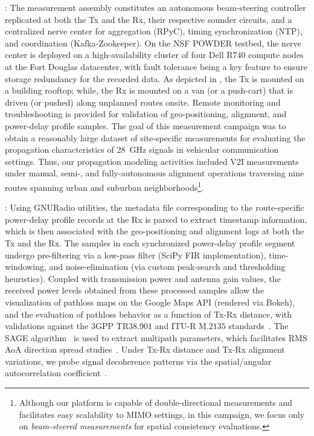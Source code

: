 \documentclass[10pt, twocolumn]{IEEEtran}
\begin{document}
: The measurement assembly constitutes an autonomous beam-steering controller replicated at both the Tx and the Rx, their respective sounder circuits, and a centralized nerve center for aggregation (RPyC), timing synchronization (NTP), and coordination (Kafka-Zookeeper). On the NSF POWDER testbed, the nerve center is deployed on a high-availability cluster of four Dell R$740$ compute nodes at the Fort Douglas datacenter, with fault tolerance being a key feature to ensure storage redundancy for the recorded data. As depicted in \cite{ICC}, the Tx is mounted on a building rooftop; while, the Rx is mounted on a van (or a push-cart) that is driven (or pushed) along unplanned routes onsite. Remote monitoring and troubleshooting is provided for validation of geo-positioning, alignment, and power-delay profile samples. The goal of this measurement campaign was to obtain a reasonably large dataset of site-specific measurements for evaluating the propagation characteristics of \SI{28}{\giga\hertz} signals in vehicular communication settings. Thus, our propagation modeling activities included V$2$I measurements under manual, semi-, and fully-autonomous alignment operations traversing nine routes spanning urban and suburban neighborhoods\footnote{Although our platform is capable of double-directional measurements and facilitates easy scalability to MIMO settings, in this campaign, we focus only on \emph{beam-steered measurements} for spatial consistency evaluations.}.

: Using GNURadio utilities, the metadata file corresponding to the route-specific power-delay profile records at the Rx is parsed to extract timestamp information, which is then associated with the geo-positioning and alignment logs at both the Tx and the Rx. The samples in each synchronized power-delay profile segment undergo pre-filtering via a low-pass filter (SciPy FIR implementation), time-windowing, and noise-elimination (via custom peak-search and thresholding heuristics). Coupled with transmission power and antenna gain values, the received power levels obtained from these processed samples allow the visualization of pathloss maps on the Google Maps API (rendered via Bokeh), and the evaluation of pathloss behavior as a function of Tx-Rx distance, with validations against the $3$GPP TR$38.901$ and ITU-R M$.2135$ standards~\cite{MacCartneyModelsOverview}. The SAGE algorithm~\cite{SAGE} is used to extract multipath parameters, which facilitates RMS AoA direction spread studies~\cite{Indoor60G}. Under Tx-Rx distance and Tx-Rx alignment variations, we probe signal decoherence patterns via the spatial/angular autocorrelation coefficient~\cite{MacCartneySpatialStatistics}.
\vspace{-3mm}
\end{document}
